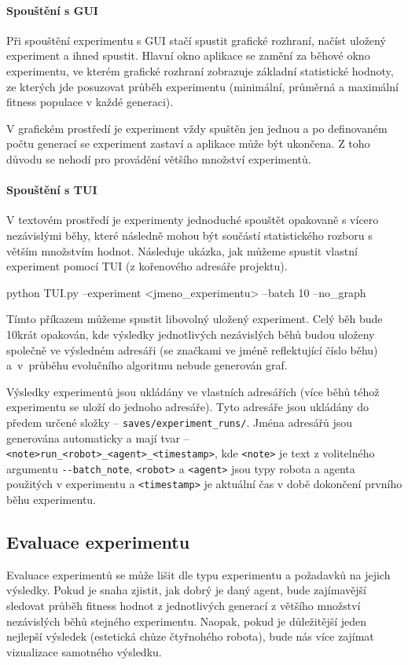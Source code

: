 \paragraph{Spouštění s GUI}
Při spouštění experimentu s GUI stačí spustit grafické rozhraní, načíst uložený
experiment a ihned spustit. Hlavní okno aplikace se zamění za běhové okno
experimentu, ve kterém grafické rozhraní zobrazuje základní statistické
hodnoty, ze kterých jde posuzovat průběh experimentu (minimální, průměrná a
maximální fitness populace v každé generaci). 

V grafickém prostředí je experiment vždy spuštěn jen jednou a po definovaném
počtu generací se experiment zastaví a aplikace může být ukončena. Z toho
důvodu se nehodí pro provádění většího množství experimentů.

\paragraph{Spouštění s TUI}
V textovém prostředí je experimenty jednoduché spouštět opakovaně s vícero
nezávislými běhy, které následně mohou být součástí statistického rozboru s
větším množstvím hodnot. Následuje ukázka, jak můžeme spustit vlastní
experiment pomocí TUI (z kořenového adresáře projektu).
\begin{code}
python TUI.py --experiment <jmeno_experimentu> --batch 10 --no_graph
\end{code}
Tímto příkazem můžeme spustit libovolný uložený experiment. Celý běh bude
10krát opakován, kde výsledky jednotlivých nezávislých běhů budou uloženy
společně ve výsledném adresáři (se značkami ve jméně reflektující číslo běhu)
a~v~průběhu evolučního algoritmu nebude generován graf. 

Výsledky experimentů jsou ukládány ve vlastních adresářích (více běhů téhož
experimentu se uloží do jednoho adresáře). Tyto adresáře jsou ukládány do
předem určené složky -- \texttt{saves/experiment\_runs/}. Jména adresářů jsou
generována automaticky a mají tvar --
\texttt{<note>run\_<robot>\_<agent>\_<timestamp>}, kde \texttt{<note>} je text
z volitelného argumentu \texttt{-{}-batch\_note}, \texttt{<robot>} a
\texttt{<agent>} jsou typy robota a agenta použitých v experimentu a
\texttt{<timestamp>} je aktuální čas v době dokončení prvního běhu experimentu.

\subsection{Evaluace experimentu} \label{doc_23_seasoning}
Evaluace experimentů se může lišit dle typu experimentu a požadavků na jejich
výsledky. Pokud je snaha zjistit, jak dobrý je daný agent, bude zajímavější
sledovat průběh fitness hodnot z jednotlivých generací z většího množství
nezávislých běhů stejného experimentu. Naopak, pokud je důležitější jeden
nejlepší výsledek (estetická chůze čtyřnohého robota), bude nás více zajímat
vizualizace samotného výsledku.

